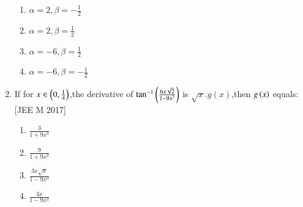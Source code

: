 \documentclass[journal,12pt,twocolumn]{IEEEtran}
\theoremstyle{remark}
\begin{document}
\begin{enumerate}
\begin{multicols}{2}
       
	      \begin{enumerate}
		      \item $\alpha=2,\beta=-\frac{1}{2}$
		      \item $\alpha=2,\beta=\frac{1}{2}$
		      \item $\alpha=-6,\beta=\frac{1}{2}$
		      \item $\alpha=-6,\beta=-\frac{1}{2}$
	      \end{enumerate}
       \end{multicols}
      \item If for $x\in\left(0,\frac{1}{4}\right)$,the derivative of $\tan^{-1}\left(\frac{6x\sqrt{2}}{1-9x^3}\right)$ is $\sqrt{x}.g(x)$,then $g\left(x\right)$ equals:
	      \hfill[JEE M 2017]\break
       \begin{multicols}{2}
           
    
	      \begin{enumerate}
		      \item $\frac{3}{1+9x^3}$
		      \item $\frac{9}{1+9x^3}$
		      \item $\frac{3x\sqrt{x}}{1-9x^3}$
		      \item $\frac{3x}{1-9x^3}$
        
	      \end{enumerate}
       \end{multicols}
	      \end{enumerate}
	      
\end{document}
